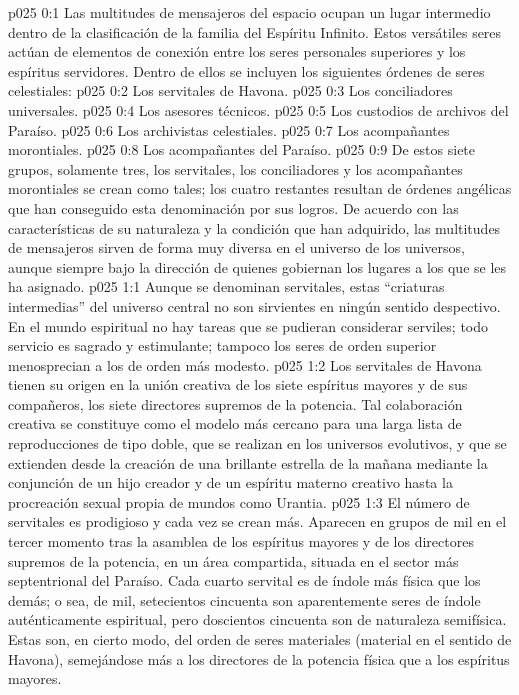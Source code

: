 \author{Un elevado en autoridad}
\vs p025 0:1 Las multitudes de mensajeros del espacio ocupan un lugar intermedio dentro de la clasificación de la familia del Espíritu Infinito. Estos versátiles seres actúan de elementos de conexión entre los seres personales superiores y los espíritus servidores. Dentro de ellos se incluyen los siguientes órdenes de seres celestiales:
\vs p025 0:2 Los servitales de Havona.
\vs p025 0:3 Los conciliadores universales.
\vs p025 0:4 Los asesores técnicos.
\vs p025 0:5 Los custodios de archivos del Paraíso.
\vs p025 0:6 Los archivistas celestiales.
\vs p025 0:7 Los acompañantes morontiales.
\vs p025 0:8 Los acompañantes del Paraíso.
\vs p025 0:9 \pc De estos siete grupos, solamente tres, los servitales, los conciliadores y los acompañantes morontiales se crean como tales; los cuatro restantes resultan de órdenes angélicas que han conseguido esta denominación por sus logros. De acuerdo con las características de su naturaleza y la condición que han adquirido, las multitudes de mensajeros sirven de forma muy diversa en el universo de los universos, aunque siempre bajo la dirección de quienes gobiernan los lugares a los que se les ha asignado.
\vs p025 1:1 Aunque se denominan servitales, estas “criaturas intermedias” del universo central no son sirvientes en ningún sentido despectivo. En el mundo espiritual no hay tareas que se pudieran considerar serviles; todo servicio es sagrado y estimulante; tampoco los seres de orden superior menosprecian a los de orden más modesto.
\vs p025 1:2 \pc Los servitales de Havona tienen su origen en la unión creativa de los siete espíritus mayores y de sus compañeros, los siete directores supremos de la potencia. Tal colaboración creativa se constituye como el modelo más cercano para una larga lista de reproducciones de tipo doble, que se realizan en los universos evolutivos, y que se extienden desde la creación de una brillante estrella de la mañana mediante la conjunción de un hijo creador y de un espíritu materno creativo hasta la procreación sexual propia de mundos como Urantia.
\vs p025 1:3 El número de servitales es prodigioso y cada vez se crean más. Aparecen en grupos de mil en el tercer momento tras la asamblea de los espíritus mayores y de los directores supremos de la potencia, en un área compartida, situada en el sector más septentrional del Paraíso. Cada cuarto servital es de índole más física que los demás; o sea, de mil, setecientos cincuenta son aparentemente seres de índole auténticamente espiritual, pero doscientos cincuenta son de naturaleza semifísica. Estas  son, en cierto modo, del orden de seres materiales (material en el sentido de Havona), semejándose más a los directores de la potencia física que a los espíritus mayores.
